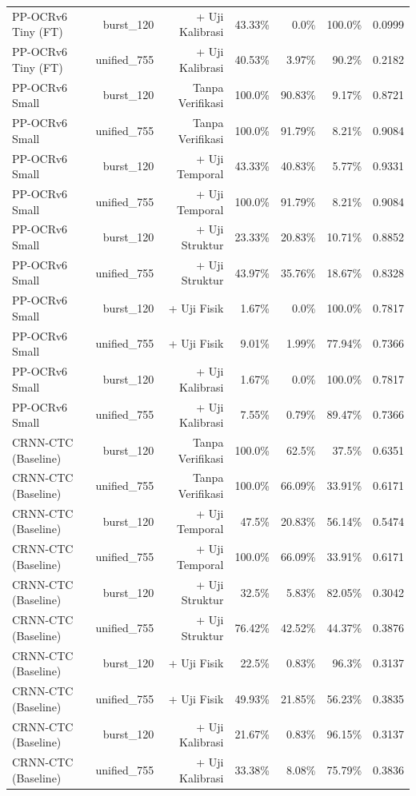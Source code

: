 \begin{table}[htbp]
\begin{tabular}{lrrrrrr}
PP-OCRv6 Tiny (FT) & burst\_120 & + Uji Kalibrasi & 43.33\% & 0.0\% & 100.0\% & 0.0999 \\
PP-OCRv6 Tiny (FT) & unified\_755 & + Uji Kalibrasi & 40.53\% & 3.97\% & 90.2\% & 0.2182 \\
PP-OCRv6 Small & burst\_120 & Tanpa Verifikasi & 100.0\% & 90.83\% & 9.17\% & 0.8721 \\
PP-OCRv6 Small & unified\_755 & Tanpa Verifikasi & 100.0\% & 91.79\% & 8.21\% & 0.9084 \\
PP-OCRv6 Small & burst\_120 & + Uji Temporal & 43.33\% & 40.83\% & 5.77\% & 0.9331 \\
PP-OCRv6 Small & unified\_755 & + Uji Temporal & 100.0\% & 91.79\% & 8.21\% & 0.9084 \\
PP-OCRv6 Small & burst\_120 & + Uji Struktur & 23.33\% & 20.83\% & 10.71\% & 0.8852 \\
PP-OCRv6 Small & unified\_755 & + Uji Struktur & 43.97\% & 35.76\% & 18.67\% & 0.8328 \\
PP-OCRv6 Small & burst\_120 & + Uji Fisik & 1.67\% & 0.0\% & 100.0\% & 0.7817 \\
PP-OCRv6 Small & unified\_755 & + Uji Fisik & 9.01\% & 1.99\% & 77.94\% & 0.7366 \\
PP-OCRv6 Small & burst\_120 & + Uji Kalibrasi & 1.67\% & 0.0\% & 100.0\% & 0.7817 \\
PP-OCRv6 Small & unified\_755 & + Uji Kalibrasi & 7.55\% & 0.79\% & 89.47\% & 0.7366 \\
CRNN-CTC (Baseline) & burst\_120 & Tanpa Verifikasi & 100.0\% & 62.5\% & 37.5\% & 0.6351 \\
CRNN-CTC (Baseline) & unified\_755 & Tanpa Verifikasi & 100.0\% & 66.09\% & 33.91\% & 0.6171 \\
CRNN-CTC (Baseline) & burst\_120 & + Uji Temporal & 47.5\% & 20.83\% & 56.14\% & 0.5474 \\
CRNN-CTC (Baseline) & unified\_755 & + Uji Temporal & 100.0\% & 66.09\% & 33.91\% & 0.6171 \\
CRNN-CTC (Baseline) & burst\_120 & + Uji Struktur & 32.5\% & 5.83\% & 82.05\% & 0.3042 \\
CRNN-CTC (Baseline) & unified\_755 & + Uji Struktur & 76.42\% & 42.52\% & 44.37\% & 0.3876 \\
CRNN-CTC (Baseline) & burst\_120 & + Uji Fisik & 22.5\% & 0.83\% & 96.3\% & 0.3137 \\
CRNN-CTC (Baseline) & unified\_755 & + Uji Fisik & 49.93\% & 21.85\% & 56.23\% & 0.3835 \\
CRNN-CTC (Baseline) & burst\_120 & + Uji Kalibrasi & 21.67\% & 0.83\% & 96.15\% & 0.3137 \\
CRNN-CTC (Baseline) & unified\_755 & + Uji Kalibrasi & 33.38\% & 8.08\% & 75.79\% & 0.3836 \\
\hline
\end{tabular}
\end{table}

